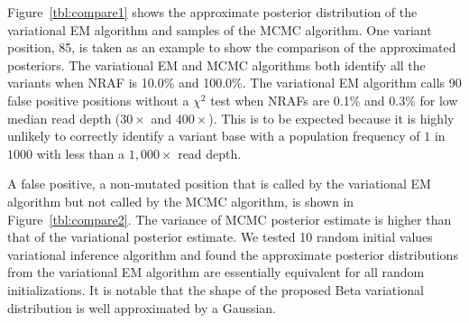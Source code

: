 \documentclass[11pt,reqno]{amsart}
\begin{document}
Figure~\ref{tbl:compare1} shows the approximate posterior distribution of the variational EM algorithm and samples of the MCMC algorithm.
One variant position, 85, is taken as an example to show the comparison of the approximated posteriors.
The variational EM and MCMC algorithms both identify all the variants when NRAF is 10.0\% and 100.0\%.
The variational EM algorithm calls 90 false positive positions without a $\chi^2$ test when NRAFs are 0.1\% and 0.3\% for low median read depth ($30\times$ and $400\times$).
This is to be expected because it is highly unlikely to correctly identify a variant base with a population frequency of $1$ in $1000$ with less than a $1,000\times$ read depth.

A false positive, a non-mutated position that is called by the variational EM algorithm but not called by the MCMC algorithm, is shown in Figure~\ref{tbl:compare2}.
The variance of MCMC posterior estimate is higher than that of the variational posterior estimate.
We tested 10 random initial values variational inference algorithm and found the approximate posterior distributions from the variational EM algorithm are essentially equivalent for all random initializations.
It is notable that the shape of the proposed Beta variational distribution is well approximated by a Gaussian.
\end{document}
